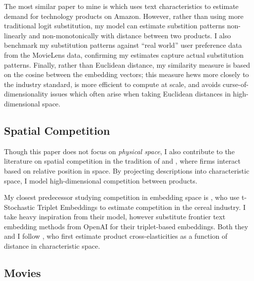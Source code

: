 \documentclass{article}
\begin{document}

The most similar paper to mine is \textcite{compiani2023} which uses text characteristics to estimate demand for technology products on Amazon. However, rather than using more traditional logit substitution, my model can estimate substition patterns non-linearly and non-monotonically with distance between two products. I also benchmark my substitution patterns against ``real world'' user preference data from the MovieLens data, confirming my estimates capture actual substitution patterns. Finally, rather than Euclidean distance, my similarity measure is based on the cosine between the embedding vectors; this measure hews more closely to the industry standard, is more efficient to compute at scale, and avoids curse-of-dimensionality issues which often arise when taking Euclidean distances in high-dimensional space. 

\subsection{Spatial Competition}

Though this paper does not focus on \emph{physical space}, I also contribute to the literature on spatial competition in the tradition of \textcite{hotelling1929E} and \textcite{salop1979BE}, where firms interact based on relative position in space. By projecting descriptions into characteristic space, I model high-dimensional competition between products. 

My closest predecessor studying competition in embedding space is \textcite{magnolfi2022}, who use t-Stochastic Triplet Embeddings to estimate competition in the cereal industry. I take heavy inspiration from their model, however substitute frontier text embedding methods from OpenAI for their triplet-based embeddings. Both they and I follow \textcite{pinkse2002E}, who first estimate product cross-elasticities as a function of distance in characteristic space.

\subsection{Movies}
\end{document}
